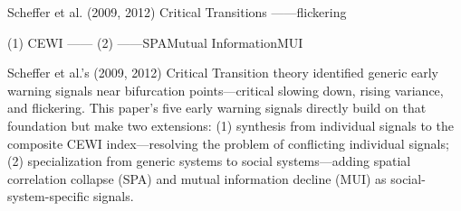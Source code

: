 \documentclass[11pt,a4paper]{article}
\theoremstyle{remark}
\begin{document}
Scheffer et al. (2009, 2012) Critical Transitions
——flickering

(1)  CEWI ——
(2) ——SPAMutual InformationMUI


Scheffer et al.'s (2009, 2012) Critical Transition theory identified generic early
warning signals near bifurcation points—critical slowing down, rising variance,
and flickering. This paper's five early warning signals directly build on that
foundation but make two extensions: (1) synthesis from individual signals to the
composite CEWI index—resolving the problem of conflicting individual signals;
(2) specialization from generic systems to social systems—adding spatial correlation
collapse (SPA) and mutual information decline (MUI) as social-system-specific signals.

\end{document}
